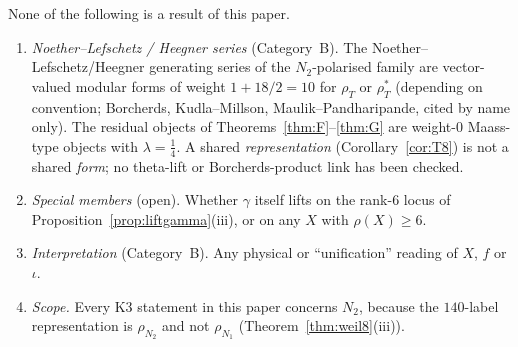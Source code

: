 \begin{remark}\label{rem:open8}
None of the following is a result of this paper.
\begin{enumerate}[label=(\alph*)]
\item \emph{Noether--Lefschetz / Heegner series} (Category~B). The Noether--Lefschetz/Heegner generating series of the $N_2$-polarised family are vector-valued modular forms of weight $1+18/2=10$ for $\rho_T$ or $\rho_T^*$ (depending on convention; Borcherds, Kudla--Millson, Maulik--Pandharipande, cited by name only). The residual objects of Theorems~\ref{thm:F}--\ref{thm:G} are weight-$0$ Maass-type objects with $\lambda=\tfrac14$. A shared \emph{representation} (Corollary~\ref{cor:T8}) is not a shared \emph{form}; no theta-lift or Borcherds-product link has been checked.
\item \emph{Special members} (open). Whether $\gamma$ itself lifts on the rank-$6$ locus of Proposition~\ref{prop:liftgamma}(iii), or on any $X$ with $\rho(X)\ge6$.
\item \emph{Interpretation} (Category~B). Any physical or ``unification'' reading of $X$, $f$ or $\iota$.
\item \emph{Scope.} Every K3 statement in this paper concerns $N_2$, because the $140$-label representation is $\rho_{N_2}$ and not $\rho_{N_1}$
(Theorem~\ref{thm:weil8}(iii)).
\end{enumerate}
\end{remark}
